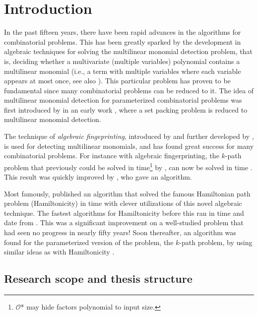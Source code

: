 
\section{Introduction}

In the past fifteen years, 
there have been rapid advances in the algorithms for combinatorial problems. 
This has been greatly sparked by the development in algebraic techniques for solving the 
multilinear monomial detection problem, that is, 
deciding whether a multivariate (multiple variables) 
polynomial contains a multilinear monomial 
(i.e., a term with multiple variables where each variable appears at most once, 
see also ). 
This particular problem has proven to be fundamental since many combinatorial 
problems can be reduced to it. 
The idea of multilinear monomial detection 
for parameterized combinatorial problems was 
first introduced by \citeauthor{Koutis05} in an early work 
\cite{Koutis05}, where a set packing problem is 
reduced to multilinear monomial detection.

The technique of \emph{algebraic fingeprinting},   
introduced by \textcite{Koutis08} and further developed by 
\textcite{Williams09}, is used for detecting multilinear monomials,  
and has found great success for many combinatorial problems. 
For instance with algebraic fingerprinting, the $k$-path problem 
that previously could be solved in  
time\footnote{$\mathcal{O}$* may hide factors polynomial to input size.} 
by \textcite{Chen07}, 
can now be solved in  time \cite{Koutis08}. 
This result was quickly improved by \textcite{Williams09}, 
who gave an  algorithm.

Most famously, 
\textcite{Björklund14} published an algorithm 
that solved the famous Hamiltonian path problem (Hamiltonicity) in  time 
with clever utilizations of this novel algebraic technique. 
The fastest algorithms for Hamiltonicity before this ran in  time 
and date from \citeyear{HelKar62} \cite{HelKar62, Bellman62}. 
This was a significant improvement on a well-studied problem 
that had seen no progress in nearly fifty years! 
Soon thereafter, an  algorithm was found
for the parameterized version of the problem, the $k$-path problem, 
by using similar ideas as with Hamiltonicity \cite{Björklund17}.

\subsection{Research scope and thesis structure}

